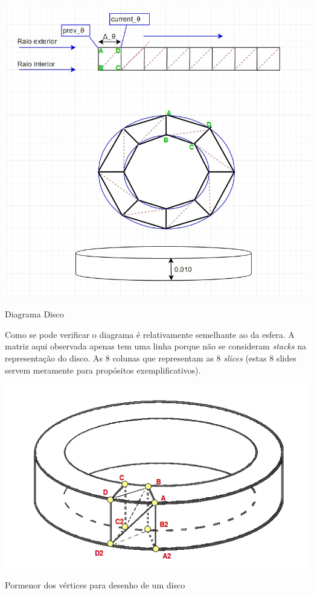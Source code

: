 \begin{center}
 	
 	\includegraphics[width=\textwidth,height=\textheight,keepaspectratio]{resources/disco.jpg}
 	\captionsetup{type=figure, width=0.8\linewidth}
	\caption{Diagrama Disco}
\label{fig:ssec1:disc} 
\end{center}

Como se pode verificar o diagrama é relativamente semelhante ao da esfera.
A matriz aqui observada apenas tem uma linha porque não se consideram
\textit{stacks} na representação do disco. As 8 colunas que representam as
8 \textit{slices} (estas 8 slides servem meramente para propósitos
exemplificativos). 


\begin{center}
 	\includegraphics[width=\textwidth,height=0.5\textheight,keepaspectratio]{resources/discodiagram.png}
 	\captionsetup{type=figure, width=0.8\linewidth}
	\caption{Pormenor dos vértices para desenho de um disco}
\label{fig:sec1:disc:vertex} 
\end{center}


